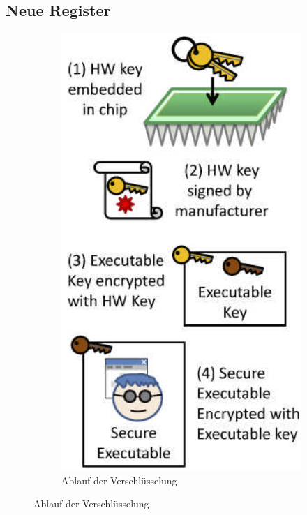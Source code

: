 \documentclass[ngerman]{sig-alternate-05-2015}
\begin{document}
\subsection{Neue Register}
\begin{figure}
	\centering
	\begin{subfigure}[b]{0.26\columnwidth}
		\includegraphics[width=\columnwidth]{hw_key2}
		\caption{Ablauf der Verschlüsselung}
		\label{fig:keys}
	\end{subfigure}

\end{figure}
\end{document}
